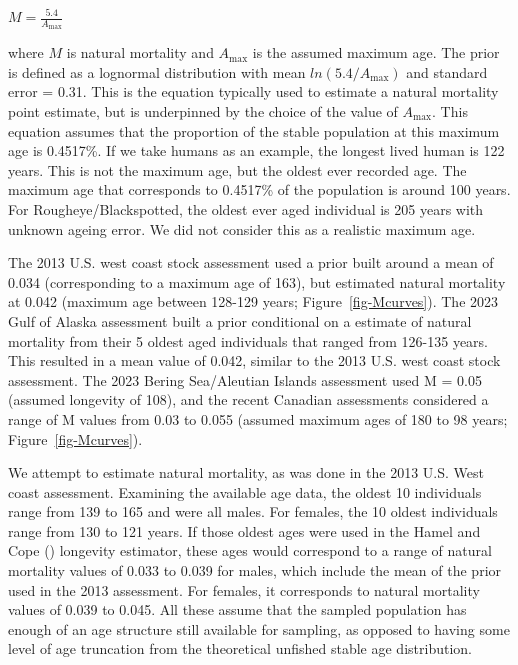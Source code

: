 \documentclass[
]{scrartcl}
\begin{document}
\begin{centering}

$M=\frac{5.4}{A_{\text{max}}}$

\end{centering}

\vspace{0.5cm}

where \(M\) is natural mortality and \({A_{\text{max}}}\) is the assumed
maximum age. The prior is defined as a lognormal distribution with mean
\(ln(5.4/A_{\text{max}})\) and standard error = 0.31. This is the
equation typically used to estimate a natural mortality point estimate,
but is underpinned by the choice of the value of \({A_{\text{max}}}\).
This equation assumes that the proportion of the stable population at
this maximum age is 0.4517\%. If we take humans as an example, the
longest lived human is 122 years. This is not the maximum age, but the
oldest ever recorded age. The maximum age that corresponds to 0.4517\%
of the population is around 100 years. For Rougheye/Blackspotted, the
oldest ever aged individual is 205 years with unknown ageing error. We
did not consider this as a realistic maximum age.

The 2013 U.S. west coast stock assessment used a prior built around a
mean of 0.034 (corresponding to a maximum age of 163), but estimated
natural mortality at 0.042 (maximum age between 128-129 years;
Figure~\ref{fig-Mcurves}). The 2023 Gulf of Alaska assessment built a
prior conditional on a estimate of natural mortality from their 5 oldest
aged individuals that ranged from 126-135 years. This resulted in a mean
value of 0.042, similar to the 2013 U.S. west coast stock assessment.
The 2023 Bering Sea/Aleutian Islands assessment used M = 0.05 (assumed
longevity of 108), and the recent Canadian assessments considered a
range of M values from 0.03 to 0.055 (assumed maximum ages of 180 to 98
years; Figure~\ref{fig-Mcurves}).

We attempt to estimate natural mortality, as was done in the 2013 U.S.
West coast assessment. Examining the available age data, the oldest 10
individuals range from 139 to 165 and were all males. For females, the
10 oldest individuals range from 130 to 121 years. If those oldest ages
were used in the Hamel and Cope
() longevity estimator, these
ages would correspond to a range of natural mortality values of 0.033 to
0.039 for males, which include the mean of the prior used in the 2013
assessment. For females, it corresponds to natural mortality values of
0.039 to 0.045. All these assume that the sampled population has enough
of an age structure still available for sampling, as opposed to having
some level of age truncation from the theoretical unfished stable age
distribution.
\end{document}
